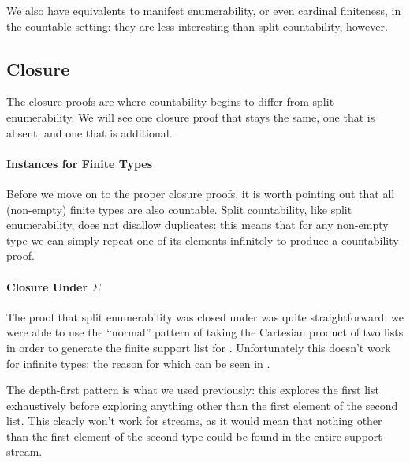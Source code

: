 We also have equivalents to manifest enumerability, or even cardinal finiteness,
in the countable setting: they are less interesting than split countability,
however.
\subsection{Closure}
The closure proofs are where countability begins to differ from split
enumerability.
We will see one closure proof that stays the same, one that is absent, and one
that is additional.
\paragraph{Instances for Finite Types}
Before we move on to the proper closure proofs, it is worth pointing out that
all (non-empty) finite types are also countable.
Split countability, like split enumerability, does not disallow duplicates: this
means that for any non-empty type we can simply repeat one of its elements
infinitely to produce a countability proof.
\paragraph{Closure Under \(\Sigma\)}
The proof that split enumerability was closed under \AgdaDatatype{\(\Sigma\)}
was quite straightforward:
we were able to use the ``normal'' pattern of taking the Cartesian product of
two lists in order to generate the finite support list for
\AgdaDatatype{\(\Sigma\)}.
Unfortunately this doesn't work for infinite types: the reason for which can be
seen in .




The depth-first pattern is what we used previously: this explores the first list
exhaustively before exploring anything other than the first element of the
second list.
This clearly won't work for streams, as it would mean that nothing other than
the first element of the second type could be found in the entire support
stream.

